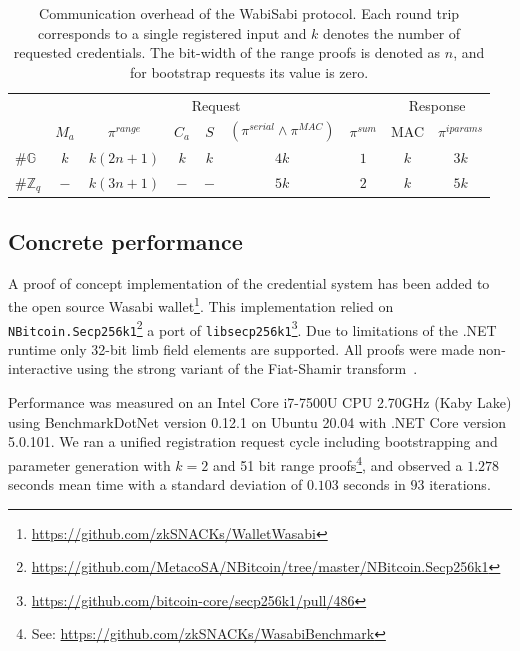 \documentclass[a4paper]{article}
\begin{document}
\begin{table}[h!]
\centering
\begin{tabular}{l|cccccc|cc}
                 & \multicolumn{6}{c|}{Request}                                                                                            & \multicolumn{2}{c}{Response}   \\
                 & $M_a$ & $\pi^{\textit{range}}$ & $C_a$ & $S$ & $(\pi^{\textit{serial}} \land \pi^{\textit{MAC}})
                 $ & $\pi^{\textit{sum}}$ & MAC & $\pi^{\textit{iparams}}$ \\
$\#\mathbb{G}$   & $k$   & $k(2n + 1)$            & $k$   & $k$ & $4k$                                             & $1$                  & $k$ & $3k$                     \\
$\#\mathbb{Z}_q$ & $-$   & $k(3n + 1)$            & $-$   & $-$ & $5k$                                             & $2$                  & $k$ & $5k$
\end{tabular}

  \caption{Communication overhead of the WabiSabi protocol. Each round trip corresponds to a single registered input and $k$ denotes the number of requested credentials. The bit-width of the range proofs is denoted as $n$, and for bootstrap requests its value is zero.}\label{tab:protocolefficiency}
\end{table}

\subsection{Concrete performance}

A proof of concept implementation of the credential system has been added to the open source Wasabi wallet\footnote{\url{https://github.com/zkSNACKs/WalletWasabi}}. This implementation relied on \texttt{NBitcoin.Secp256k1}\footnote{\url{https://github.com/MetacoSA/NBitcoin/tree/master/NBitcoin.Secp256k1}} a port of \texttt{libsecp256k1}\footnote{\url{https://github.com/bitcoin-core/secp256k1/pull/486}}. Due to limitations of the .NET runtime only 32-bit limb field elements are supported. All proofs were made non-interactive using the strong variant of the Fiat-Shamir transform~\cite{fiat1987prove, bernhard2012not, hamburg2017strobe}.

Performance was measured on an Intel Core i7-7500U CPU 2.70GHz (Kaby Lake) using BenchmarkDotNet version 0.12.1 on Ubuntu 20.04 with .NET Core version 5.0.101. We ran a unified registration request cycle including bootstrapping and parameter generation with $k=2$ and 51 bit range proofs\footnote{See: \url{https://github.com/zkSNACKs/WasabiBenchmark}}, and observed a $1.278$ seconds mean time with a standard deviation of $0.103$ seconds in $93$ iterations.
\end{document}
